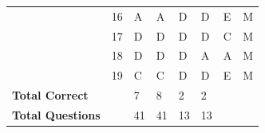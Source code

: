 \documentclass[pageno]{jpaper}
\begin{document}
\begin{table}[]
\begin{tabular}{llllllll}
\textbf{}                & 16              & A                       & A                      & D                       & D                       & E                       & M                   \\
\textbf{}                & 17              & D                       & D                      & D                       & D                       & C                       & M                   \\
\textbf{}                & 18              & D                       & D                      & D                       & A                       & A                       & M                   \\
\textbf{}                & 19              & C                       & C                      & D                       & D                       & E                       & M                   \\ \midrule
\textbf{Total Correct}   &                 & 7                       & 8                      & 2                       & 2                       &                         &                     \\
\textbf{Total Questions} &                 & 41                      & 41                     & 13                      & 13                      &                         &                     \\ \bottomrule
\end{tabular}
\end{table}
\end{document}
